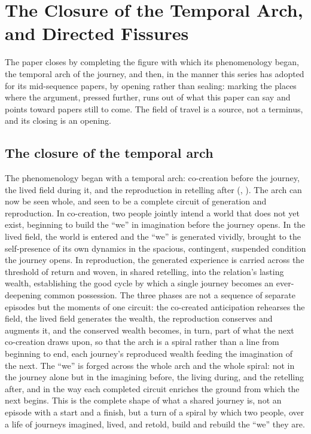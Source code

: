 \section{The Closure of the Temporal Arch, and Directed Fissures}
\label{p21:sec:closure}

\noindent
The paper closes by completing the figure with which its phenomenology began, the temporal arch of the journey, and then, in the manner this series has adopted for its mid-sequence papers, by opening rather than sealing: marking the places where the argument, pressed further, runs out of what this paper can say and points toward papers still to come. The field of travel is a source, not a terminus, and its closing is an opening.

\subsection{The closure of the temporal arch}
\label{p21:sub:clo-arch}

The phenomenology began with a temporal arch: co-creation before the journey, the lived field during it, and the reproduction in retelling after (, ). The arch can now be seen whole, and seen to be a complete circuit of generation and reproduction. In co-creation, two people jointly intend a world that does not yet exist, beginning to build the ``we'' in imagination before the journey opens. In the lived field, the world is entered and the ``we'' is generated vividly, brought to the self-presence of its own dynamics in the spacious, contingent, suspended condition the journey opens. In reproduction, the generated experience is carried across the threshold of return and woven, in shared retelling, into the relation's lasting wealth, establishing the good cycle by which a single journey becomes an ever-deepening common possession. The three phases are not a sequence of separate episodes but the moments of one circuit: the co-created anticipation rehearses the field, the lived field generates the wealth, the reproduction conserves and augments it, and the conserved wealth becomes, in turn, part of what the next co-creation draws upon, so that the arch is a spiral rather than a line from beginning to end, each journey's reproduced wealth feeding the imagination of the next. The ``we'' is forged across the whole arch and the whole spiral: not in the journey alone but in the imagining before, the living during, and the retelling after, and in the way each completed circuit enriches the ground from which the next begins. This is the complete shape of what a shared journey is, not an episode with a start and a finish, but a turn of a spiral by which two people, over a life of journeys imagined, lived, and retold, build and rebuild the ``we'' they are.

